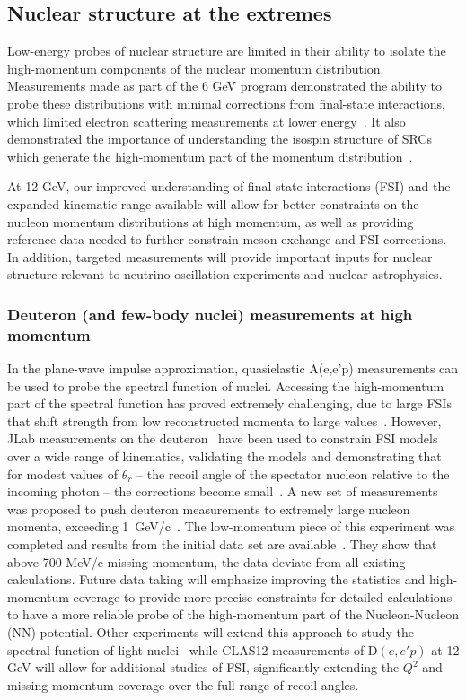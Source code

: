 \subsection{Nuclear structure at the extremes}

Low-energy probes of nuclear structure are limited in their ability to isolate the high-momentum components of the nuclear momentum distribution. Measurements made as part of the 6 GeV program demonstrated the ability to probe these distributions with minimal corrections from final-state interactions, which limited electron scattering measurements at lower energy~\cite{Arrington:2011xs}. It also demonstrated the importance of understanding the isospin structure of SRCs which generate the high-momentum part of the momentum distribution~\cite{Arrington:2011xs,Hen:2016kwk,Fomin:2017ydn}.

At 12 GeV, our improved understanding of final-state interactions (FSI) and the expanded kinematic range available will allow for better constraints on the nucleon momentum distributions at high momentum, as well as providing reference data needed to further constrain meson-exchange and FSI corrections. In addition, targeted measurements will provide important inputs for nuclear structure relevant to neutrino oscillation experiments and nuclear astrophysics.


\subsubsection{Deuteron (and few-body nuclei) measurements at high momentum}

In the plane-wave impulse approximation, quasielastic A(e,e'p) measurements can be used to probe the spectral function of nuclei. Accessing the high-momentum part of the spectral function has proved extremely challenging, due to large FSIs that shift strength from low reconstructed momenta to large values~\cite{Sargsian:2002wc}. However, JLab measurements on the deuteron~\cite{CLAS:2007tee, HallA:2011gjn} have been used to constrain FSI  models~\cite{Sargsian:2009hf} over a wide range of kinematics, validating the models and demonstrating that for modest values of $\theta_r$ -- the recoil angle of the spectator nucleon relative to the incoming photon -- the corrections become small~\cite{CLAS:2007tee,HallA:2011gjn,Arrington:2011xs}. A new set of measurements was proposed to push deuteron measurements to extremely large nucleon momenta, exceeding 1~GeV/c~\cite{E12-10-003}. The low-momentum piece of this experiment was completed and results from the initial data set are available~\cite{HallC:2020kdm}. They show that above 700 MeV/c missing momentum, the data deviate from all existing calculations. Future data taking will emphasize improving the statistics and high-momentum coverage to provide more precise constraints for detailed calculations to have a more reliable probe of the high-momentum part of the Nucleon-Nucleon (NN) potential. Other experiments will extend this approach to study the spectral function of light nuclei~\cite{E12-20-005}
while CLAS12 measurements of D$(e,e'p)$ at 12 GeV will allow for additional studies of FSI, significantly extending the $Q^2$ and missing momentum coverage over the full range of recoil angles.

